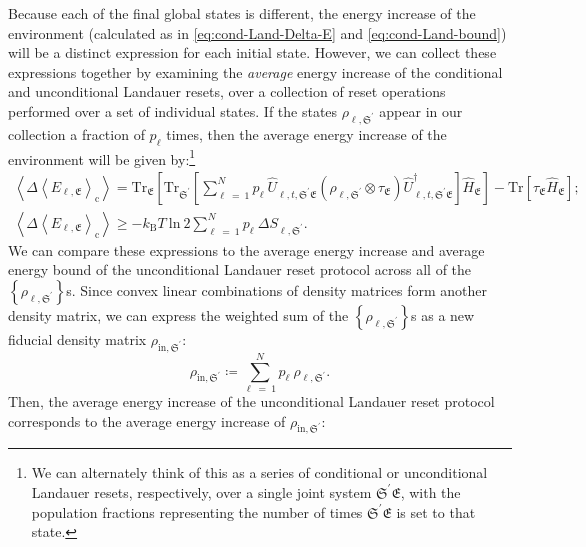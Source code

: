 \documentclass[preprints,article,accept,moreauthors,pdftex]{Definitions/mdpi}
\begin{document}
\begin{paracol}{2}
Because each of the final global states is different, the energy increase of the environment (calculated as in \eqref{eq:cond-Land-Delta-E} and \eqref{eq:cond-Land-bound}) will be a distinct expression for each initial state. However, we can collect these expressions together by examining the \emph{average} energy increase of the conditional and unconditional Landauer resets, over a collection of reset operations performed over a set of individual states. If the states $\rho_{\ell,\mathfrak{S}^{\prime}}$ appear in our collection a fraction of $p_{\ell}$ times, then the average energy increase of the environment will be given by:\footnote{We can alternately think \cite{Anderson19} of this as a series of conditional or unconditional Landauer resets, respectively, over a single joint system $\mathfrak{S^\prime E}$, with the population fractions representing the number of times $\mathfrak{S^\prime E}$ is set to that state.}
\begin{gather}
    \label{cond-Land-avg-E}
    \left\langle \Delta \left\langle E_{\ell,\mathfrak{E}} \right\rangle_{\mathrm{c}} \right\rangle = \mathrm{Tr}_{\mathfrak{E}}\left[\mathrm{Tr}_{\mathfrak{S}^{\prime}} \left[ \sum_{\ell\:=\:1}^{N} p_{\ell}\:\widehat{U}_{\ell,t,\mathfrak{S^\prime E}} \left( \rho_{\ell,\mathfrak{S}^{\prime}} \otimes \tau_{\mathfrak{E}} \right) \widehat{U}_{\ell,t,\mathfrak{S^\prime E}}^{\dagger} \right] \widehat{H}_{\mathfrak{E}} \right] - \mathrm{Tr}\left[\tau_{\mathfrak{E}} \widehat{H}_{\mathfrak{E}} \right]; \\[4pt]
    \left\langle \Delta \left\langle E_{\ell,\mathfrak{E}}\right\rangle_{\mathrm{c}}\right\rangle \geq  -k_{\mathrm{B}}T\:\mathrm{ln}\:2\sum_{\ell\:=\:1}^{N}p_{\ell}\:\Delta S_{\ell,\mathfrak{S}^{\prime}}.
\end{gather}
We can compare these expressions to the average energy increase and average energy bound of the unconditional Landauer reset protocol across all of the $\left\{\rho_{\ell,\mathfrak{S}^{\prime}}\right\}$s. Since convex linear combinations of density matrices form another density matrix, we can express the weighted sum of the $\left\{\rho_{\ell,\mathfrak{S}^{\prime}}\right\}$s as a new fiducial density matrix $\rho_{\mathrm{in},\mathfrak{S}^{\prime}}$:
\begin{equation}
    \label{uncond-Land-fiducial-DM}
    \rho_{\mathrm{in},\mathfrak{S}^{\prime}} \coloneqq \sum_{\ell\:=\:1}^{N}p_{\ell}\:\rho_{\ell,\mathfrak{S}^{\prime}}.
\end{equation}
Then, the average energy increase of the unconditional Landauer reset protocol corresponds \cite{Anderson19} to the average energy increase of $\rho_{\mathrm{in},\mathfrak{S}^{\prime}}$:

\end{paracol}
\end{document}
